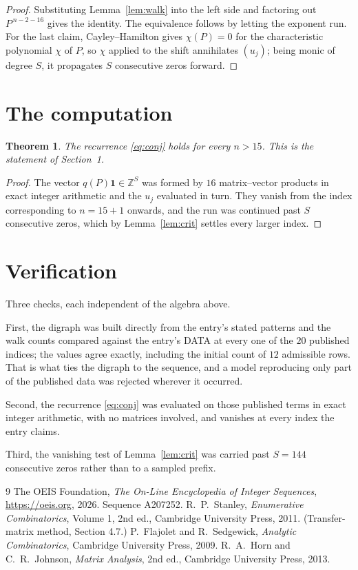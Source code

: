 \documentclass[11pt,a4paper]{article}
\theoremstyle{plain}
\newtheorem{theorem}{Theorem}
\theoremstyle{definition}
\begin{document}
\begin{proof}
Substituting Lemma~\ref{lem:walk} into the left side and factoring out
$P^{\,n-2-16}$ gives the identity. The equivalence follows by letting the exponent
run. For the last claim, Cayley--Hamilton gives $\chi(P)=0$ for the characteristic
polynomial $\chi$ of $P$, so $\chi$ applied to the shift annihilates $(u_j)$; being monic of
degree $S$, it propagates $S$ consecutive zeros forward.
\end{proof}

\section{The computation}

\begin{theorem}
The recurrence \eqref{eq:conj} holds for every $n>15$. This is the statement of
Section~1.
\end{theorem}

\begin{proof}
The vector $q(P)\mathbf{1}\in\mathbb{Z}^{S}$ was formed by $16$ matrix--vector
products in exact integer arithmetic and the $u_j$ evaluated in turn. They vanish from the
index corresponding to $n=15+1$ onwards, and the run was continued past $S$ consecutive
zeros, which by Lemma~\ref{lem:crit} settles every larger index.
\end{proof}

\section{Verification}

Three checks, each independent of the algebra above.

First, the digraph was built directly from the entry's stated patterns and the walk counts
compared against the entry's DATA at every one of the $20$ published indices; the
values agree exactly, including the initial count of $12$ admissible rows. That is
what ties the digraph to the sequence, and a model reproducing only part of the published
data was rejected wherever it occurred.

Second, the recurrence \eqref{eq:conj} was evaluated on those published terms in exact
integer arithmetic, with no matrices involved, and vanishes at every index the entry claims.

Third, the vanishing test of Lemma~\ref{lem:crit} was carried past $S=144$ consecutive
zeros rather than to a sampled prefix.

\begin{thebibliography}{9}
 The OEIS Foundation, \emph{The On-Line Encyclopedia of Integer
Sequences}, \url{https://oeis.org}, 2026. Sequence A207252.
 R.~P.~Stanley, \emph{Enumerative Combinatorics}, Volume 1, 2nd ed.,
Cambridge University Press, 2011. (Transfer-matrix method, Section 4.7.)
 P.~Flajolet and R.~Sedgewick, \emph{Analytic Combinatorics}, Cambridge
University Press, 2009.
 R.~A.~Horn and C.~R.~Johnson, \emph{Matrix Analysis}, 2nd ed., Cambridge
University Press, 2013.
\end{thebibliography}
\end{document}
